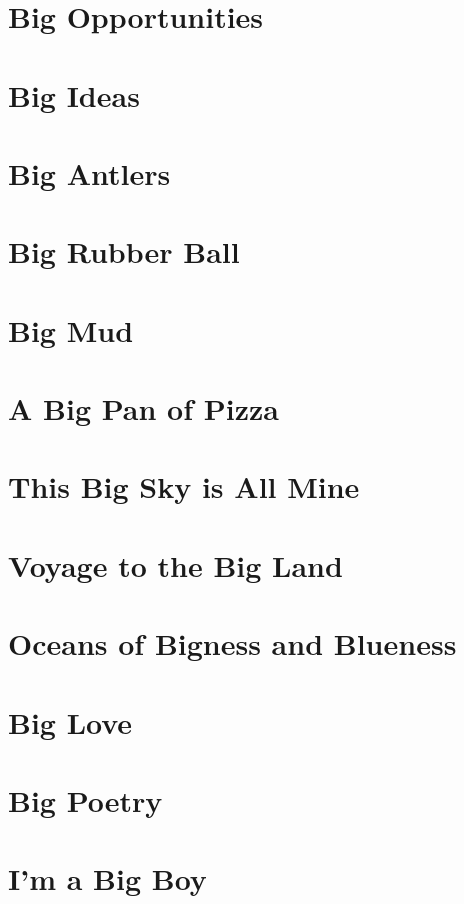 \chapter{Big Opportunities}


\chapter{Big Ideas}


\chapter{Big Antlers}


\chapter{Big Rubber Ball}


\chapter{Big Mud}


\chapter{A Big Pan of Pizza}


\chapter{This Big Sky is All Mine}


\chapter{Voyage to the Big Land}


\chapter{Oceans of Bigness and Blueness}


\chapter{Big Love}


\chapter{Big Poetry}


\chapter{I'm a Big Boy}
